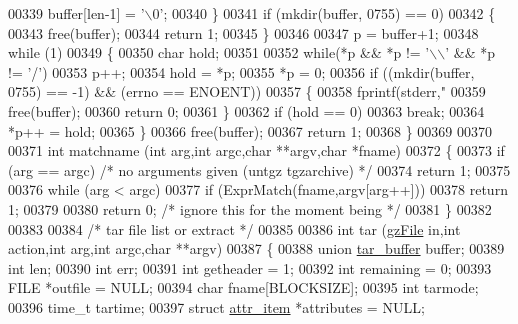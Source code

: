 \begin{DoxyCode}
{{{00339     buffer[len-1] = \textcolor{charliteral}{'\(\backslash\)0'};
00340   \}
00341   \textcolor{keywordflow}{if} (mkdir(buffer, 0755) == 0)
00342     \{
00343       free(buffer);
00344       \textcolor{keywordflow}{return} 1;
00345     \}
00346 
00347   p = buffer+1;
00348   \textcolor{keywordflow}{while} (1)
00349     \{
00350       \textcolor{keywordtype}{char} hold;
00351 
00352       \textcolor{keywordflow}{while}(*p && *p != \textcolor{charliteral}{'\(\backslash\)\(\backslash\)'} && *p != \textcolor{charliteral}{'/'})
00353         p++;
00354       hold = *p;
00355       *p = 0;
00356       \textcolor{keywordflow}{if} ((mkdir(buffer, 0755) == -1) && (errno == ENOENT))
00357         \{
00358           fprintf(stderr,\textcolor{stringliteral}{"%
00359           free(buffer);
00360           \textcolor{keywordflow}{return} 0;
00361         \}
00362       \textcolor{keywordflow}{if} (hold == 0)
00363         \textcolor{keywordflow}{break};
00364       *p++ = hold;
00365     \}
00366   free(buffer);
00367   \textcolor{keywordflow}{return} 1;
00368 \}
00369 
00370 
00371 \textcolor{keywordtype}{int} matchname (\textcolor{keywordtype}{int} arg,\textcolor{keywordtype}{int} argc,\textcolor{keywordtype}{char} **argv,\textcolor{keywordtype}{char} *fname)
00372 \{
00373   \textcolor{keywordflow}{if} (arg == argc)      \textcolor{comment}{/* no arguments given (untgz tgzarchive) */}
00374     \textcolor{keywordflow}{return} 1;
00375 
00376   \textcolor{keywordflow}{while} (arg < argc)
00377     \textcolor{keywordflow}{if} (ExprMatch(fname,argv[arg++]))
00378       \textcolor{keywordflow}{return} 1;
00379 
00380   \textcolor{keywordflow}{return} 0; \textcolor{comment}{/* ignore this for the moment being */}
00381 \}
00382 
00383 
00384 \textcolor{comment}{/* tar file list or extract */}
00385 
00386 \textcolor{keywordtype}{int} tar (\hyperlink{structgz_file__s}{gzFile} in,\textcolor{keywordtype}{int} action,\textcolor{keywordtype}{int} arg,\textcolor{keywordtype}{int} argc,\textcolor{keywordtype}{char} **argv)
00387 \{
00388   \textcolor{keyword}{union  }\hyperlink{uniontar__buffer}{tar\_buffer} buffer;
00389   \textcolor{keywordtype}{int}    len;
00390   \textcolor{keywordtype}{int}    err;
00391   \textcolor{keywordtype}{int}    getheader = 1;
00392   \textcolor{keywordtype}{int}    remaining = 0;
00393   FILE   *outfile = NULL;
00394   \textcolor{keywordtype}{char}   fname[BLOCKSIZE];
00395   \textcolor{keywordtype}{int}    tarmode;
00396   time\_t tartime;
00397   \textcolor{keyword}{struct }\hyperlink{structattr__item}{attr\_item} *attributes = NULL;
}}}}
\end{DoxyCode}
